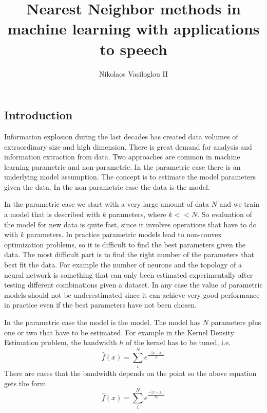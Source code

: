 \documentclass[12pt,letterpaper,doublespaced,ETD,dvips,proposal]{gtthesis}
\title{Nearest Neighbor methods in machine learning with applications to speech}
\author{Nikolaos Vasiloglou II}
\begin{document}
\pagestyle{plain}

\begin{FrontMatter}
\contents %
\end{FrontMatter}

\begin{Body}
\section{Introduction}
\label{intro} Information explosion during the last decades has
created data volumes of extraordinary size and high dimension. There
is great demand for analysis and information extraction from data.
Two approaches are common in machine learning parametric and
non-parametric. In the parametric case there is an underlying model
assumption. The concept is to estimate the model parameters given
the data. In the non-parametric case the data is the model.

In the parametric case we start with a very large amount of data $N$
and we train a model that is described with $k$ parameters, where
$k<<N$. So evaluation of the model for new data is quite fast, since
it involves operations that have to do with $k$ parameters. In
practice parametric models lead to non-convex optimization problems,
so it is difficult to find the best parameters given the data. The
most difficult part is to find the right number of the parameters
that best fit the data. For example the number of neurons and the
topology of a neural network is something that can only been
estimated experimentally after testing different combinations given
a dataset. In any case the value of parametric models should not be
underestimated since it can achieve very good performance in
practice even if the best parameters have not been chosen.

In the parametric case the model is the model. The model has $N$
parameters plus one or two that have to be estimated. For example in
the Kernel Density Estimation problem, the bandwidth $h$ of the
kernel has to be tuned, i.e.
\begin{equation}
\hat{f}(x)=\sum_{i}^{N}e^{\frac{-||x-x_i||}{h}}
\end{equation}
There are cases that the bandwidth depends on the point so the above
equation gets the form
\begin{equation}
\hat{f}(x)=\sum_{i}^{N}e^{\frac{-||x-x_i||}{h_i}}
\end{equation}


\end{Body}
\end{document}

